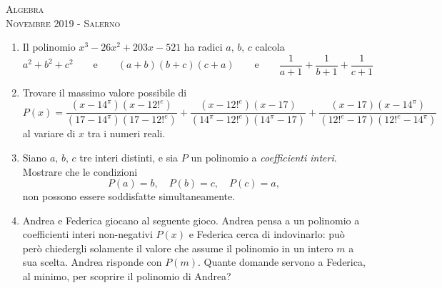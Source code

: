 \documentclass[a4paper]{article}
\theoremstyle{remark}
\theoremstyle{definition}
\begin{document}
\newpage
\begin{center}
	\vspace*{0,5 cm}
	{\Huge \textsc{Algebra}} \\
	\vspace{0,5 cm}
	\textsc{Novembre 2019 - Salerno}
	\thispagestyle{empty}
	\vspace{0,7 cm}
\end{center}
\normalsize

\begin{enumerate}
	\item  Il polinomio $ x^3 -26x^2 + 203x - 521 $ ha radici $a,\, b,\, c$ calcola 
	\[ a^2 + b^2 + c^2 \qquad\text{e}\qquad (a+b)(b+c)(c+a) \qquad\text{e}\qquad \frac{1}{a+1}+\frac{1}{b+1}+\frac{1}{c+1}\]
	
	\item  Trovare il massimo valore possibile di
	\[ P(x) = \frac{(x-14^\pi)(x-12!^e)}{(17-14^\pi)(17-12!^e)} 
	+\frac{(x-12!^e)(x-17)}{(14^\pi-12!^e)(14^\pi-17)} +\frac{(x-17)(x-14^\pi)}{(12!^e-17)(12!^e-14^\pi)} \]
	al variare di $ x $ tra i numeri reali.
	
	\item Siano $ a,\, b,\, c $ tre interi distinti, e sia $ P $ un polinomio a \emph{coefficienti interi}. Mostrare che le condizioni $$  P(a) = b,\quad P(b) = c,\quad P(c) = a,  $$ non possono essere soddisfatte simultaneamente.
	
	\item Andrea e Federica giocano al seguente gioco. Andrea pensa a un polinomio a coefficienti interi non-negativi $ P(x) $ e Federica cerca di indovinarlo: può però chiedergli solamente il valore che assume il polinomio in un intero $ m $ a sua scelta. Andrea risponde con $ P(m) $. Quante domande servono a Federica, al minimo, per scoprire il polinomio di Andrea?
	
	
\end{enumerate}
\end{document}
